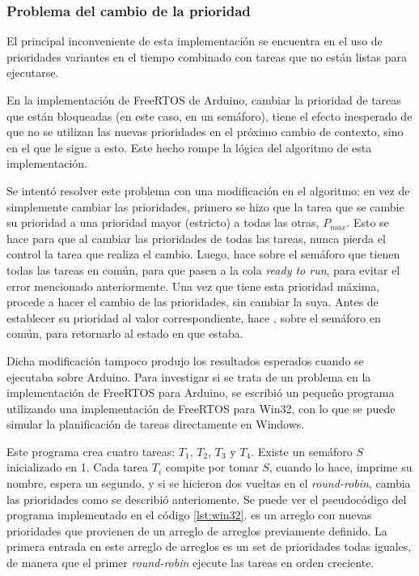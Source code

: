 	\subsubsection{Problema del cambio de la prioridad}
	El principal inconveniente de esta implementación se encuentra en el uso de prioridades variantes en el tiempo combinado con tareas que no están listas para ejecutarse.

	En la implementación de FreeRTOS de Arduino, cambiar la prioridad de tareas que están bloqueadas (en este caso, en un semáforo), tiene el efecto inesperado de que no se utilizan las nuevas prioridades en el próximo cambio de contexto, sino en el que le sigue a esto. Este hecho rompe la lógica del algoritmo de esta implementación.

	Se intentó resolver este problema con una modificación en el algoritmo: en vez de simplemente cambiar las prioridades, primero se hizo que la tarea que se cambie su prioridad a una prioridad mayor (estricto) a todas las otras, $P_{max}$.
	Esto se hace para que al cambiar las prioridades de todas las tareas, nunca pierda el control la tarea que realiza el cambio.
	Luego, hace  sobre el semáforo que tienen todas las tareas en común, para que pasen a la cola \emph{ready to run}, para evitar el error mencionado anteriormente.
	Una vez que tiene esta prioridad máxima, procede a hacer el cambio de las prioridades, sin cambiar la suya.
	Antes de establecer su prioridad al valor correspondiente, hace , sobre el semáforo en común, para retornarlo al estado en que estaba.

	Dicha modificación tampoco produjo los resultados esperados cuando se ejecutaba sobre Arduino.
	Para investigar si se trata de un problema en la implementación de FreeRTOS para Arduino, se escribió un pequeño programa utilizando una implementación de FreeRTOS para Win32, con lo que se puede simular la planificación de tareas directamente en Windows.

	Este programa crea cuatro tareas: $T_1$, $T_2$, $T_3$ y $T_4$. Existe un semáforo $S$ inicializado en 1.
	Cada tarea $T_i$ compite por tomar $S$, cuando lo hace, imprime su nombre, espera un segundo, y si se hicieron dos vueltas en el \emph{round-robin}, cambia las prioridades como se describió anteriomente. Se puede ver el pseudocódigo del programa implementado en el código \ref{lst:win32}.  es un arreglo con nuevas prioridades que provienen de un arreglo de arreglos previamente definido. La primera entrada en este arreglo de arreglos es un set de prioridades todas iguales, de manera que el primer \emph{round-robin} ejecute las tareas en orden creciente.

